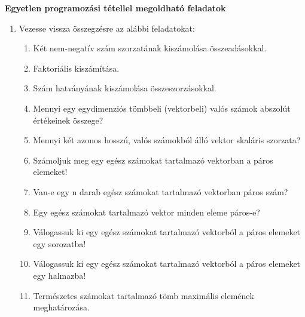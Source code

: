 \documentclass[12pt,twoside,a4paper]{article}	%
\begin{document}

\textbf{Egyetlen programozási tétellel megoldható feladatok}
\begin{enumerate}
\item Vezesse vissza összegzésre az alábbi feladatokat:
	\begin{enumerate}
	\item Két nem-negatív szám szorzatának kiszámolása összeadásokkal.
	\item Faktoriális kiszámítása.
	\item Szám hatványának kiszámolása összeszorzásokkal.
	\item Mennyi egy egydimenziós tömbbeli (vektorbeli) valós számok abszolút értékeinek összege?
	\item Mennyi két azonos hosszú, valós számokból álló vektor skaláris szorzata?
	\item Számoljuk meg egy egész számokat tartalmazó vektorban a páros elemeket!
	\item Van-e egy n darab egész számokat tartalmazó vektorban páros szám?
	\item Egy egész számokat tartalmazó vektor minden eleme páros-e?
	\item Válogassuk ki egy egész számokat tartalmazó vektorból a páros elemeket egy sorozatba!
	\item Válogassuk ki egy egész számokat tartalmazó vektorból a páros elemeket egy halmazba!
	\item Természetes számokat tartalmazó tömb maximális elemének meghatározása.
	\end{enumerate}
\end{enumerate}
\end{document}
